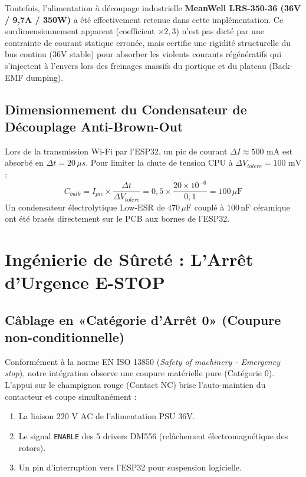 Toutefois, l'alimentation à découpage industrielle \textbf{MeanWell LRS-350-36 (36V / 9{,}7A / 350W)} a été effectivement retenue dans cette implémentation. Ce surdimensionnement apparent (coefficient $\times 2{,}3$) n'est pas dicté par une contrainte de courant statique erronée, mais certifie une rigidité structurelle du bus continu ($36\text{V}$ stable) pour absorber les violents courants régénératifs qui s'injectent à l'envers lors des freinages massifs du portique et du plateau (Back-EMF dumping).

\subsection{Dimensionnement du Condensateur de Découplage Anti-Brown-Out}
Lors de la transmission Wi-Fi par l'ESP32, un pic de courant $\Delta I \approx 500 \text{ mA}$ est absorbé en $\Delta t = 20\,\mu s$. Pour limiter la chute de tension CPU à $\Delta V_{tolere} = 100 \text{ mV}$ :
\begin{equation}
    C_{bulk} = I_{pic} \times \frac{\Delta t}{\Delta V_{tolere}} = 0{,}5 \times \frac{20 \times 10^{-6}}{0{,}1} = \boxed{100\,\mu\text{F}}
\end{equation}
Un condensateur électrolytique Low-ESR de $470\,\mu\text{F}$ couplé à $100\,\text{nF}$ céramique ont été brasés directement sur le PCB aux bornes de l'ESP32.

\section{Ingénierie de Sûreté : L'Arrêt d'Urgence E-STOP}

\subsection{Câblage en «Catégorie d'Arrêt 0» (Coupure non-conditionnelle)}
Conformément à la norme EN ISO 13850 (\textit{Safety of machinery - Emergency stop}), notre intégration observe une coupure matérielle pure (Catégorie 0). L'appui sur le champignon rouge (Contact NC) brise l'auto-maintien du contacteur et coupe simultanément :
\begin{enumerate}
    \item La liaison $220\text{ V AC}$ de l'alimentation PSU 36V.
    \item Le signal \texttt{ENABLE} des 5 drivers DM556 (relâchement électromagnétique des rotors).
    \item Un pin d'interruption vers l'ESP32 pour suspension logicielle.
\end{enumerate}

